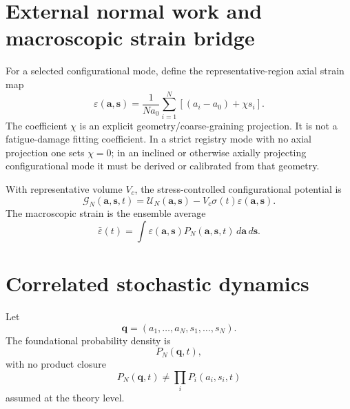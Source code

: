 \documentclass[11pt]{article}
\begin{document}
\section{External normal work and macroscopic strain bridge}
For a selected configurational mode, define the representative-region axial strain map
\begin{equation}
 \varepsilon(\bm a,\bm s)
 =
 \frac{1}{Na_0}
 \sum_{i=1}^{N}
 \left[(a_i-a_0)+\chi s_i\right].
 \label{eq:strainmap}
\end{equation}
The coefficient $\chi$ is an explicit geometry/coarse-graining projection. It is not a fatigue-damage fitting coefficient. In a strict registry mode with no axial projection one sets $\chi=0$; in an inclined or otherwise axially projecting configurational mode it must be derived or calibrated from that geometry.

With representative volume $V_c$, the stress-controlled configurational potential is
\begin{equation}
 \boxed{
 \mathcal G_N(\bm a,\bm s,t)
 =
 \mathcal U_N(\bm a,\bm s)
 -
 V_c\sigma(t)\varepsilon(\bm a,\bm s).
 }
 \label{eq:GN}
\end{equation}
The macroscopic strain is the ensemble average
\begin{equation}
 \boxed{
 \bar\varepsilon(t)
 =
 \int \varepsilon(\bm a,\bm s)
 P_N(\bm a,\bm s,t)\,d\bm a\,d\bm s.
 }
 \label{eq:macrostrain}
\end{equation}

\section{Correlated stochastic dynamics}
Let
\begin{equation}
 \bm q=(a_1,\ldots,a_N,s_1,\ldots,s_N).
\end{equation}
The foundational probability density is
\begin{equation}
 \boxed{P_N(\bm q,t)},
\end{equation}
with no product closure
\begin{equation}
 P_N(\bm q,t)\neq\prod_i P_i(a_i,s_i,t)
\end{equation}
assumed at the theory level.
\end{document}
